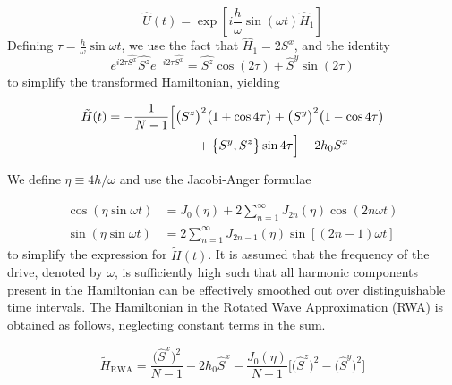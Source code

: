 \documentclass[%
reprint,
superscriptaddress,
amsmath,amssymb,
aps,
prb,
showkeys,
]{revtex4-2}
\begin{document}
	\begin{equation}
	\hat{U}(t)=\exp [i \frac{h}{\omega} \sin (\omega t) \hat{H}_{1}]
	\end{equation}
	Defining $\tau = \displaystyle\frac{h}{\omega}\sin{\omega t}$, we use the fact that $\hat{H}_1 = 2 S^x$, and the identity  
	\begin{equation}
	e^{i 2\tau\hat{S^{x}}} \hat{S^{z}} e^{-i 2\tau \hat{S^{x}}}=\hat{S^{z}} \cos \left(2\tau\right)+\hat{S}^{y} \sin (2\tau)
	\end{equation}
	to simplify the transformed Hamiltonian, yielding
	
	\begin{align}
		\tilde{H}(t)& = -\frac{1}{N-1}\Big[\big(S^z\big)^2 \big(1+\cos{4\tau}\big)+ \big(S^y\big)^2 \big(1-\cos{4\tau}\big)\nonumber \\  
		&\hskip 2.5cm + \big\{S^y, S^z\big\}\sin{4\tau}\Big] - 2 h_0 S^x
	\end{align}
	
	
	We define $\eta\equiv 4h/\omega$ and use the Jacobi-Anger formulae ~\cite{arfkenmath}
	
	\begin{align*}
		\cos(\eta \sin\omega t) &= J_{0}(\eta)+2 \sum_{n=1}^{\infty} J_{2 n}(\eta) \cos (2 n \omega t) \\
		\sin(\eta \sin\omega t) &= 2 \sum_{n=1}^{\infty} J_{2 n-1}(\eta)\sin [(2 n-1) \omega t]
	\end{align*}
	to simplify the expression for $\tilde{H}(t)$. It is assumed that the frequency of the drive, denoted by $\omega$, is sufficiently high such that all harmonic components present in the Hamiltonian can be effectively smoothed out over distinguishable time intervals. The Hamiltonian in the Rotated Wave Approximation (RWA) is obtained as follows, neglecting constant terms in the sum.
	
	\begin{equation}
	\tilde{H}_{\mathrm{RWA}}= \frac{\big(\hat{S}^x\big)^{2}}{N-1} - 2h_0 \hat{S}^x - \frac{J_0(\eta)}{N-1}\bigg[\big(\hat{S}^z\big)^{2} - \big(\hat{S}^y\big)^{2} \bigg]
	\end{equation}
	
\end{document}
